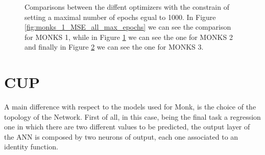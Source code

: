 \begin{figure}[t!]
\begin{subfigure}{0.45\textwidth}
                    \caption{}
                    \label{fig:monks_2_MSE_all_max_epochs}
                \end{subfigure}
                \begin{subfigure}{0.45\textwidth}
                    \caption{}
                    \label{fig:monks_3_MSE_all_max_epochs}
                \end{subfigure}
                \caption{Comparisons between the diffent optimizers with the constrain of setting a
                maximal number of epochs egual to 1000. In Figure \ref{fig:monks_1_MSE_all_max_epochs}
                we can see the comparison for MONKS 1, while in Figure \ref{fig:monks_2_MSE_all_max_epochs}
                we can see the one for MONKS 2 and finally in Figure \ref{fig:monks_3_MSE_all_max_epochs} we
                can see the one for MONKS 3.}
                \label{fig:monks_MSE_all_max_epochs}
            \end{figure}


    \section{CUP} %
        \label{sec:cup}

        A main difference with respect to the models used for Monk, is the choice of the topology of the Network.
        First of all, in this case, being the final task a regression one in which there are two different values to be predicted, the output layer of the ANN is composed by two neurons of output, each one associated to an identity function.


